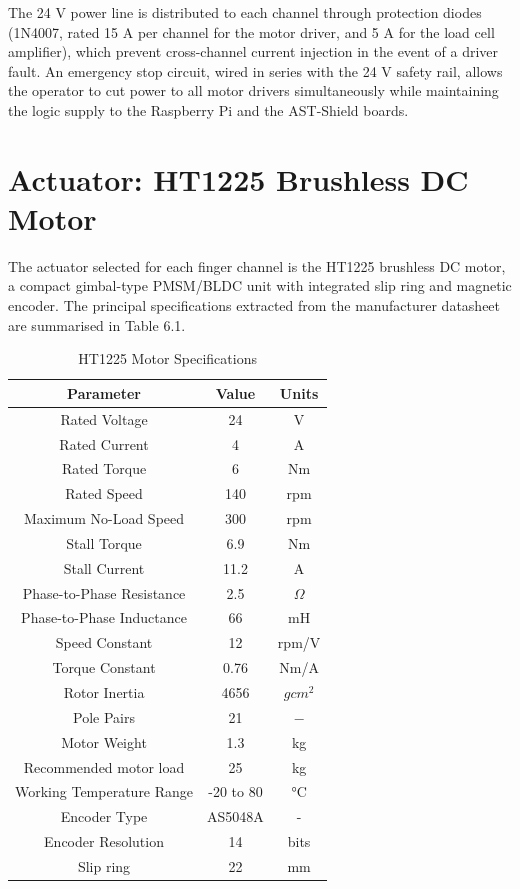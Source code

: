 The 24 V power line is distributed to each channel through protection diodes (1N4007, rated 15 A per channel for the motor driver, and 5 A for the load cell amplifier), which prevent cross-channel current injection in the event of a driver fault. An emergency stop circuit, wired in series with the 24 V safety rail, allows the operator to cut power to all motor drivers simultaneously while maintaining the logic supply to the Raspberry Pi and the AST-Shield boards.

\section{Actuator: HT1225 Brushless DC Motor}
The actuator selected for each finger channel is the HT1225 brushless DC motor, a compact gimbal-type PMSM/BLDC unit with integrated slip ring and magnetic encoder. The principal specifications extracted from the manufacturer datasheet are summarised in Table 6.1.

\begin{table}[h]
    \centering
    \begin{tabular}{|c|c|c|}
        \hline
        Parameter & Value & Units \\
        \hline
        Rated Voltage & 24 & V \\
        Rated Current & 4 & A \\
        Rated Torque & 6 & Nm \\
        Rated Speed & 140 & rpm \\
        Maximum No-Load Speed & 300 & rpm \\
        Stall Torque & 6.9 & Nm \\
        Stall Current & 11.2 & A \\
        Phase-to-Phase Resistance & 2.5 & $\Omega$ \\
        Phase-to-Phase Inductance & 66 & mH \\
        Speed Constant & 12 & rpm/V \\
        Torque Constant & 0.76 & Nm/A \\
        Rotor Inertia & 4656 & $g cm^2$ \\
        Pole Pairs & 21 &$ -$ \\
        Motor Weight & 1.3 & kg \\
        Recommended motor load & 25 & kg \\
        Working Temperature Range & -20 to 80 & °C \\
        Encoder Type & AS5048A & - \\
        Encoder Resolution & 14 & bits \\
        Slip ring & 22 & mm \\
        \hline
    \end{tabular}
    \caption{HT1225 Motor Specifications}
\end{table}

